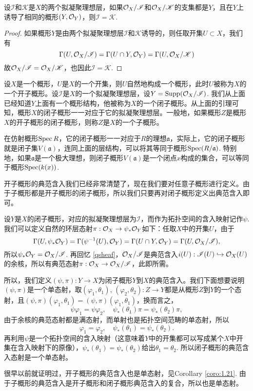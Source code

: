 \begin{lem}
设$\mathscr{I}$和$\mathscr{K}$是$X$的两个拟凝聚理想层，如果$\mathcal{O}_X/\mathscr{I}$和$\mathcal{O}_X/\mathscr{K}$的支集都是$Y$，且在$Y$上诱导了相同的概形$(Y,\mathcal{O}_Y)$，则$\mathscr{I}=\mathscr{K}$.
\end{lem}

\begin{proof}
如果概形$Y$是由两个拟凝聚理想层$\mathscr{I}$和$\mathscr{K}$诱导的，则任取开集$U\subset X$，我们有
\[
	\Gamma(U,\mathcal{O}_X/\mathscr{I})=\Gamma(U\cap Y,\mathcal{O}_Y)=\Gamma(U,\mathcal{O}_X/\mathscr{K})
\]
故$\mathcal{O}_X/\mathscr{I}=\mathcal{O}_X/\mathscr{K}$，也因此$\mathscr{I}=\mathscr{K}$.
\end{proof}

\begin{para}[子概形]
设$X$是一个概形，$U$是$X$的一个开集，则$U$自然地构成一个概形，此时$U$被称为$X$的一个开子概形。设$\mathscr{I}$是$X$的一个拟凝聚理想层，设$Y=\mathrm{Supp}(\mathcal{O}_X/\mathscr{I})$. 我们从上面已经知道$Y$上面有一个概形结构，他被称为$X$的一个闭子概形。从上面的引理可知，概形$X$的闭子概形一一对应于它的拟凝聚理想层。一般地，如果概形$Z$是概形$X$的开子概形的闭子概形，则称$Z$是$X$的一个子概形。

在仿射概形$\operatorname{Spec} R$，它的闭子概形一一对应于$R$的理想$\mathfrak a$，实际上，它的闭子概形就是闭子集$V(\mathfrak a)$，连同上面的层结构，可以将其等同于概形$\operatorname{Spec}(R/\mathfrak a)$. 特别地，如果$\mathfrak a$是一个极大理想，则闭子概形$V(\mathfrak a)$是一个闭点$x$构成的集合，可以等同于概形$\operatorname{Spec}(k(x))$.
\end{para}

\begin{para}[子概形的典范含入]
开子概形的典范含入我们已经非常清楚了，现在我们要对任意子概形进行定义。由于子概形都是开子概形的闭子概形，所以我们只要再对闭子概形定义出典范含入即可。

设$Y$是$X$的闭子概形，对应的拟凝聚理想层为$\mathscr I$，而作为拓扑空间的含入映射记作$\psi$. 我们可以定义自然的环层态射$\pi:\mathcal{O}_X\to \psi_*\mathcal{O}_Y$如下：任取$X$中的开集$U$，由于
\[
	\Gamma(U,\psi_*\mathcal{O}_Y)=\Gamma(\psi^{-1}(U),\mathcal{O}_Y)=\Gamma(U\cap Y,\mathcal{O}_Y)=\Gamma(U,\mathcal{O}_X/\mathscr I),
\]
所以$\psi_*\mathcal{O}_Y=\mathcal{O}_X/\mathscr I$. 再回忆 \ref{qsheaf}，$\mathcal{O}_X/\mathscr I$是典范含入$i(U):\mathscr I(U)\hookrightarrow \mathcal{O}_X(U)$的余核，所以有典范态射$\pi:\mathcal{O}_X\to \mathcal{O}_X/\mathscr I$，此即所需。

所以，我们定义$(\psi,\pi):Y\to X$为闭子概形$Y$到$X$的典范含入。我们下面想要说明$(\psi,\pi)$是一个单态射，取$(\varphi_1,\theta_1)$, $(\varphi_2,\theta_2):Z\to Y$都是从概形$Z$到$Y$的一个态射，且$(\psi,\pi)(\varphi_1,\theta_1)=(\psi,\pi)(\varphi_1,\theta_1)$，换而言之，
\[
	\psi\varphi_1=\psi\varphi_2,\quad \psi_*(\theta_1)\pi=\psi_*(\theta_2)\pi,
\]
由于余核的典范态射都是满态射，而单射也是拓扑空间范畴的单态射，所以
\[
	\varphi_1=\varphi_2,\quad \psi_*(\theta_1)=\psi_*(\theta_2).
\]
再利用$\psi$是一个拓扑空间的含入映射（这意味着$Y$中的开集都可以写成某个$X$中开集在含入映射下的原像），$\psi_*(\theta_1)=\psi_*(\theta_2)$给出$\theta_1=\theta_2$. 所以闭子概形的典范含入态射是一个单态射。

很早以前就证明过，开子概形的典范含入也是单态射，见Corollary \ref{coro:1.21}. 由于子概形的典范含入是开子概形和闭子概形典范含入的复合，所以也是单态射。
\end{para}

